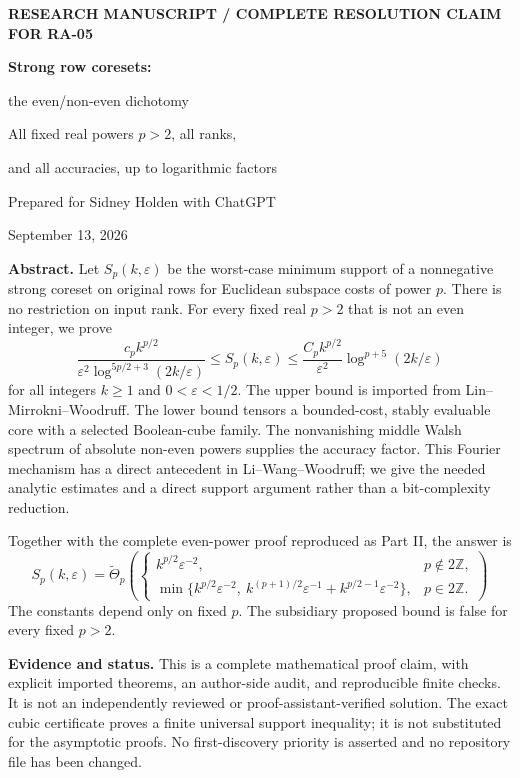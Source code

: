 \documentclass[11pt]{article}
\theoremstyle{remark}\newtheorem{remark}[theorem]{Remark}
\newcommand{\eps}{\varepsilon}\newcommand{\norm}[1]{\left\|#1\right\|}
\begin{document}
\begin{titlepage}
{\small\bfseries RESEARCH MANUSCRIPT / COMPLETE RESOLUTION CLAIM FOR RA-05}\par\vspace{1cm}
{\huge\bfseries Strong row coresets:\par the even/non-even dichotomy}\par\vspace{.45cm}
{\Large All fixed real powers $p>2$, all ranks,\par and all accuracies, up to logarithmic factors}\par\vspace{.7cm}
Prepared for Sidney Holden with ChatGPT\par
September 13, 2026\par\vspace{.6cm}
\textbf{Abstract.} Let $S_p(k,\eps)$ be the worst-case minimum support of a nonnegative strong coreset on original rows for Euclidean subspace costs of power $p$. There is no restriction on input rank. For every fixed real $p>2$ that is not an even integer, we prove
\[
 \frac{c_p k^{p/2}}{\eps^2\log^{5p/2+3}(2k/\eps)}
 \le S_p(k,\eps)
 \le \frac{C_p k^{p/2}}{\eps^2}\log^{p+5}(2k/\eps)
\]
for all integers $k\ge1$ and $0<\eps<1/2$. The upper bound is imported from Lin--Mirrokni--Woodruff. The lower bound tensors a bounded-cost, stably evaluable core with a selected Boolean-cube family. The nonvanishing middle Walsh spectrum of absolute non-even powers supplies the accuracy factor. This Fourier mechanism has a direct antecedent in Li--Wang--Woodruff; we give the needed analytic estimates and a direct support argument rather than a bit-complexity reduction.

Together with the complete even-power proof reproduced as Part II, the answer is
\[
 S_p(k,\eps)=\widetilde\Theta_p\!\left(
 \begin{cases}
 k^{p/2}\eps^{-2},&p\notin 2\mathbb Z,\\[1mm]
 \min\{k^{p/2}\eps^{-2},\ k^{(p+1)/2}\eps^{-1}
                  +k^{p/2-1}\eps^{-2}\},&p\in2\mathbb Z.
 \end{cases}\right)
\]
The constants depend only on fixed $p$. The subsidiary proposed bound is false for every fixed $p>2$.

\vfill
\textbf{Evidence and status.} This is a complete mathematical proof claim, with explicit imported theorems, an author-side audit, and reproducible finite checks. It is not an independently reviewed or proof-assistant-verified solution. The exact cubic certificate proves a finite universal support inequality; it is not substituted for the asymptotic proofs. No first-discovery priority is asserted and no repository file has been changed.
\end{titlepage}
\tableofcontents
\clearpage
\end{document}
